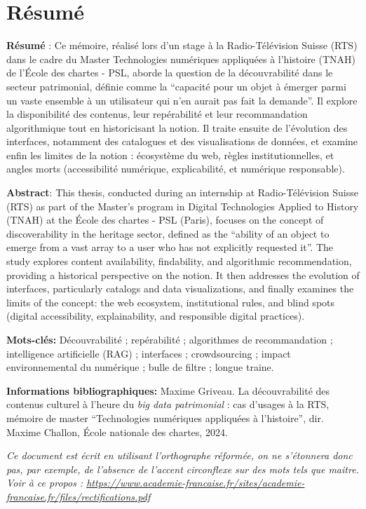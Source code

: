 \documentclass[a4paper,12pt,twoside]{book}
\begin{document}
	\chapter{Résumé}
	\textbf{Résumé} : Ce mémoire, réalisé lors d'un stage à la Radio-Télévision Suisse (RTS) dans le cadre du Master Technologies numériques appliquées à l'histoire (TNAH) de l'École des chartes - PSL, aborde la question de la découvrabilité dans le secteur patrimonial, définie comme la \enquote{capacité pour un objet à émerger parmi un vaste ensemble à un utilisateur qui n'en aurait pas fait la demande}. Il explore la disponibilité des contenus, leur repérabilité et leur recommandation algorithmique tout en historicisant la notion. Il traite ensuite de l'évolution des interfaces, notamment des catalogues et des visualisations de données, et examine enfin les limites de la notion : écosystème du web, règles institutionnelles, et angles morts (accessibilité numérique, explicabilité, et numérique responsable).
	
	\textbf{Abstract}: This thesis, conducted during an internship at Radio-Télévision Suisse (RTS) as part of the Master's program in Digital Technologies Applied to History (TNAH) at the École des chartes - PSL (Paris), focuses on the concept of discoverability in the heritage sector, defined as the \enquote{ability of an object to emerge from a vast array to a user who has not explicitly requested it}. The study explores content availability, findability, and algorithmic recommendation, providing a historical perspective on the notion. It then addresses the evolution of interfaces, particularly catalogs and data visualizations, and finally examines the limits of the concept: the web ecosystem, institutional rules, and blind spots (digital accessibility, explainability, and responsible digital practices).
	
	\textbf{Mots-clés:} Découvrabilité ; repérabilité ; algorithmes de recommandation ; intelligence artificielle (RAG) ; interfaces ; crowdsourcing ; impact environnemental du numérique ; bulle de filtre ; longue traine.  
	
	\textbf{Informations bibliographiques:} Maxime Griveau. La découvrabilité des contenus culturel à l'heure du \textit{big data patrimonial} : cas d'usages à la RTS, mémoire de master \enquote{Technologies numériques appliquées à l'histoire}, dir. Maxime Challon, École nationale des chartes, 2024.
	
	\textit{Ce document est écrit en utilisant l'orthographe réformée, on ne s'étonnera donc pas, par exemple, de l'absence de l'accent circonflexe sur des mots tels que maitre.
		Voir à ce propos : \url{https://www.academie-francaise.fr/sites/academie-francaise.fr/files/rectifications.pdf}}
	\newpage{\pagestyle{empty}\cleardoublepage}
	
\end{document}
